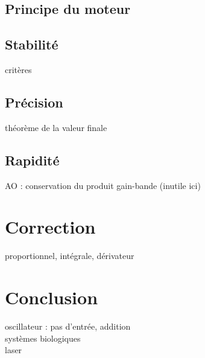 \subsection{Principe du moteur}
\subsection{Stabilité}
critères \\
\subsection{Précision}
théorème de la valeur finale \\
\subsection{Rapidité}

AO : conservation du produit gain-bande (inutile ici) \\


\section{Correction}
proportionnel, intégrale, dérivateur \\


\section*{Conclusion}
oscillateur : pas d'entrée, addition \\
systèmes biologiques \\
laser \\

